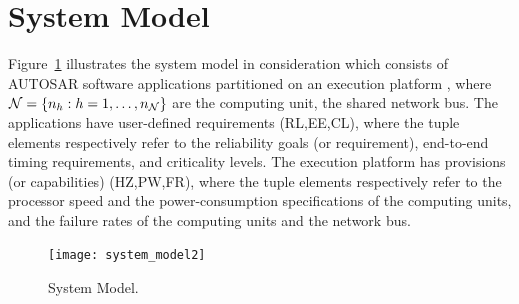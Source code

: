 \section{System Model}\label{sec_system}
Figure~\ref{fig_system} illustrates the system model in consideration which consists of AUTOSAR software applications  partitioned on an execution platform \tteP, where  $\sexp{\pN}{n}[h]$ are the computing unit, \ttpB the shared network bus. The applications have user-defined requirements {\sffamily(RL,EE,CL)}, where the tuple elements respectively refer to the reliability goals (or requirement), end-to-end timing requirements, and criticality levels. The execution platform has  provisions (or capabilities) {\sffamily(HZ,PW,FR)}, where the tuple elements respectively refer to the processor speed and the power-consumption specifications of the computing units, and the failure rates of the computing units and the network bus.
 \begin{figure}[!h]
	\centering
	\texttt{[image: system\_model2]}%
	\caption{System Model.}
	\label{fig_system}
\end{figure}

